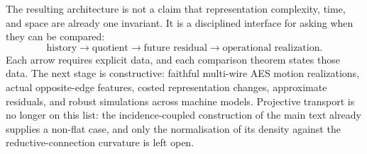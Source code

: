 The resulting architecture is not a claim that representation complexity,
time, and space are already one invariant.  It is a disciplined interface for
asking when they can be compared:
\[
  \text{history}
  \longrightarrow
  \text{quotient}
  \longrightarrow
  \text{future residual}
  \longrightarrow
  \text{operational realization}.
\]
Each arrow requires explicit data, and each comparison theorem states those
data.  The next stage is constructive: faithful multi-wire AES motion
realizations, actual opposite-edge features, costed representation changes,
approximate residuals, and robust simulations across machine models.  Projective
transport is no longer on this list: the incidence-coupled construction of the
main text already supplies a non-flat case, and only the normalisation of its
density against the reductive-connection curvature is left open.
